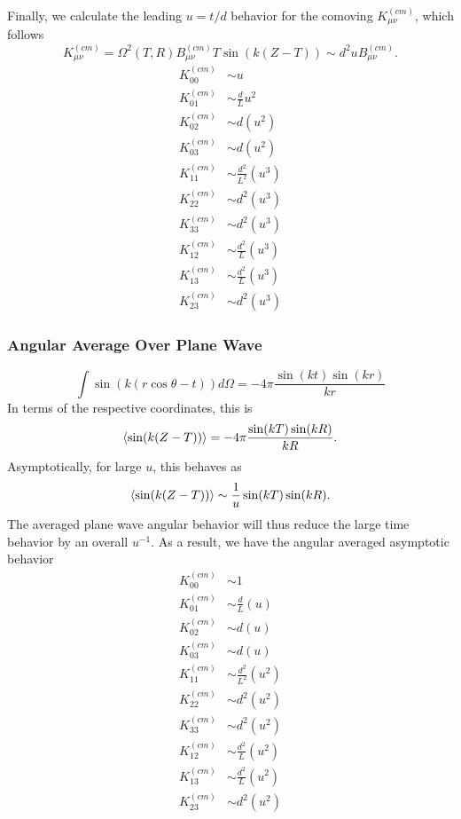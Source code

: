 \documentclass[10pt,letterpaper]{article}
\begin{document}
Finally, we calculate the leading $u= t/d$ behavior for the comoving $K_{\mu\nu}^{(cm)}$, which follows
\begin{equation}
K^{(cm)}_{\mu\nu} = \Omega^2(T,R)  B_{\mu\nu}^{(cm)} T \sin(k(Z-T)) \sim d^2 u B_{\mu\nu}^{(cm)}.
\end{equation}
\begin{align}
K^{(cm)}_{00} &\sim u \nonumber\\
K^{(cm)}_{01} &\sim \frac{d}{L} u^2 \nonumber\\
K^{(cm)}_{02} &\sim d(u^2) \nonumber\\
K^{(cm)}_{03} &\sim d(u^2) \nonumber\\
K^{(cm)}_{11} &\sim \frac{d^2}{L^2}(u^3) \nonumber\\
K^{(cm)}_{22} &\sim d^2(u^3) \nonumber\\
K^{(cm)}_{33} &\sim d^2(u^3) \nonumber\\
K^{(cm)}_{12} &\sim \frac{d^2}{L}(u^3) \nonumber\\
K^{(cm)}_{13} &\sim \frac{d^2}{L}(u^3) \nonumber\\
K^{(cm)}_{23} &\sim d^2(u^3)
\end{align}
\subsubsection*{Angular Average Over Plane Wave}
\begin{equation}
\int \sin(k(r\cos\theta-t))d\Omega = -4\pi \frac{\sin(kt)\sin(kr)}{kr} 
\end{equation}
In terms of the respective coordinates, this is
\begin{equation}
\braket{\sin(k(Z-T))} = -4\pi \frac{\sin(kT)\sin(kR)}{kR}.
\end{equation}
Asymptotically, for large $u$, this behaves as
\begin{equation}
\braket{\sin(k(Z-T))} \sim \frac{1}{u} \sin(kT)\sin(kR).
\end{equation}
The averaged plane wave angular behavior will thus reduce the large time behavior by an overall $u^{-1}$. As a result, we have the angular averaged asymptotic behavior
\begin{align}
K^{(cm)}_{00} &\sim 1 \nonumber\\
K^{(cm)}_{01} &\sim \frac{d}{L}(u) \nonumber\\
K^{(cm)}_{02} &\sim d(u) \nonumber\\
K^{(cm)}_{03} &\sim d(u) \nonumber\\
K^{(cm)}_{11} &\sim \frac{d^2}{L^2}(u^2) \nonumber\\
K^{(cm)}_{22} &\sim d^2(u^2) \nonumber\\
K^{(cm)}_{33} &\sim d^2(u^2) \nonumber\\
K^{(cm)}_{12} &\sim \frac{d^2}{L}(u^2) \nonumber\\
K^{(cm)}_{13} &\sim \frac{d^2}{L}(u^2) \nonumber\\
K^{(cm)}_{23} &\sim d^2(u^2)
\end{align}
\newpage
\end{document}
